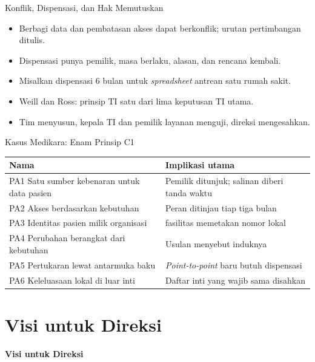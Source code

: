 \documentclass[aspectratio=169, table, 12pt]{beamer}
\begin{document}
\begin{frame}{{\Large Konflik, Dispensasi, dan Hak Memutuskan}}
  \vspace{10pt}
  \begin{itemize}
    \item Berbagi data dan pembatasan akses dapat berkonflik; urutan pertimbangan ditulis.
    \item Dispensasi punya pemilik, masa berlaku, alasan, dan rencana kembali.
    \item Misalkan dispensasi 6 bulan untuk \textit{spreadsheet} antrean satu rumah sakit.
    \item Weill dan Ross: prinsip TI satu dari lima keputusan TI utama.
    \item Tim menyusun, kepala TI dan pemilik layanan menguji, direksi mengesahkan.
  \end{itemize}
\end{frame}

\begin{frame}{{\Large Kasus Medikara: Enam Prinsip C1}}
  \footnotesize
  \begin{tabularx}{\textwidth}{>{\raggedright\arraybackslash}p{5.3cm}
      >{\raggedright\arraybackslash}X}
    \hline
    \textbf{Nama} & \textbf{Implikasi utama} \\
    \hline
    PA1 Satu sumber kebenaran untuk data pasien & Pemilik ditunjuk; salinan diberi tanda waktu \\
    \hline
    PA2 Akses berdasarkan kebutuhan & Peran ditinjau tiap tiga bulan \\
    \hline
    PA3 Identitas pasien milik organisasi & 36 fasilitas memetakan nomor lokal \\
    \hline
    PA4 Perubahan berangkat dari kebutuhan & Usulan menyebut induknya \\
    \hline
    PA5 Pertukaran lewat antarmuka baku & \textit{Point-to-point} baru butuh dispensasi \\
    \hline
    PA6 Keleluasaan lokal di luar inti & Daftar inti yang wajib sama disahkan \\
    \hline
  \end{tabularx}
\end{frame}

\section{Visi untuk Direksi}

\begin{frame}{\hfill}
  \centering
  \Huge{\textbf{Visi untuk Direksi}}
\end{frame}
\end{document}
